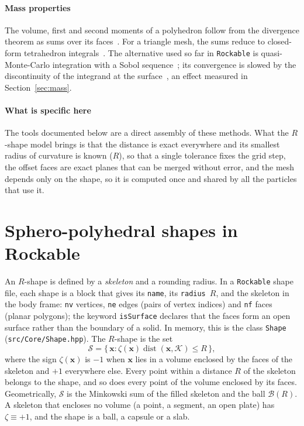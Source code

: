 \documentclass[11pt,a4paper]{article}
\newcommand{\Rmink}{R}                 %
\newcommand{\skel}{\mathcal{K}}        %
\newcommand{\ball}{\mathcal{B}}        %
\newcommand{\shape}{\mathcal{S}}       %
\newcommand{\vect}[1]{\mathbf{#1}}
\newcommand{\sgnsdf}{\zeta}
\newcommand{\code}[1]{\texttt{#1}}
\begin{document}
\paragraph{Mass properties}
The volume, first and second moments of a polyhedron follow from the divergence
theorem as sums over its faces~\cite{lien1984,mirtich1996}. For a triangle mesh,
the sums reduce to closed-form tetrahedron integrals~\cite{tonon2005,kallay2006}.
The alternative used so far in \code{Rockable} is quasi-Monte-Carlo integration
with a Sobol sequence~\cite{sobol1967,niederreiter1992}; its convergence is slowed
by the discontinuity of the integrand at the
surface~\cite{he2015}, an effect measured in Section~\ref{sec:mass}.

\paragraph{What is specific here}
The tools documented below are a direct assembly of these methods. What the
$R$-shape model brings is that the distance is exact everywhere and its smallest
radius of curvature is known ($\Rmink$), so that a single tolerance fixes the grid
step, the offset faces are exact planes that can be merged without error, and the
mesh depends only on the shape, so it is computed once and shared by all the
particles that use it.

\section{Sphero-polyhedral shapes in Rockable}
\label{sec:rshapes}

An $R$-shape is defined by a \emph{skeleton} and a rounding radius. In a
\code{Rockable} shape file, each shape is a block that gives its \code{name}, its
\code{radius}~$\Rmink$, and the skeleton in the body frame: \code{nv} vertices,
\code{ne} edges (pairs of vertex indices) and \code{nf} faces (planar polygons);
the keyword \code{isSurface} declares that the faces form an open surface rather
than the boundary of a solid. In memory, this is the class \code{Shape}
(\code{src/Core/Shape.hpp}). The $R$-shape is the set
%
\begin{equation}
  \shape = \{\, \vect{x} : \sgnsdf(\vect{x})\operatorname{dist}(\vect{x},\skel) \le \Rmink \,\},
  \label{eq:minkowski}
\end{equation}
%
where the sign $\sgnsdf(\vect{x})$ is $-1$ when $\vect{x}$ lies in a volume
enclosed by the faces of the skeleton and $+1$ everywhere else. Every point within
a distance $\Rmink$ of the skeleton belongs to the shape, and so does every point
of the volume enclosed by its faces. Geometrically, $\shape$ is the Minkowski sum
of the filled skeleton and the ball $\ball(\Rmink)$. A skeleton that encloses no
volume (a point, a segment, an open plate) has $\sgnsdf\equiv+1$, and the shape is
a ball, a capsule or a slab.
\end{document}
